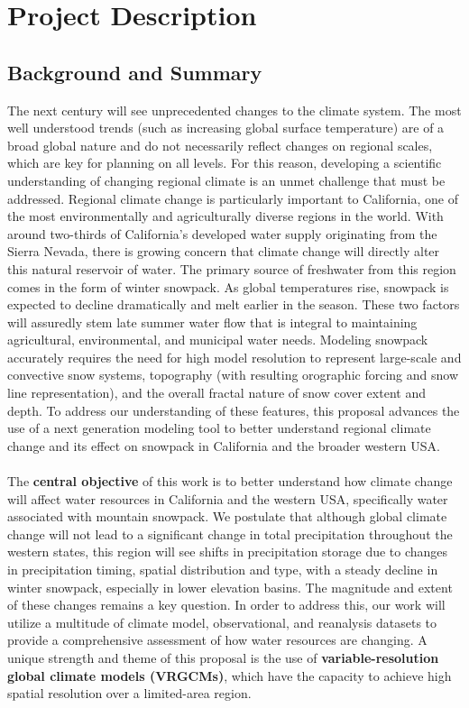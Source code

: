 \documentclass[11pt]{article}
\begin{document}


\section{Project Description}
\subsection{Background and Summary}
The next century will see unprecedented changes to the climate system. The most well understood trends (such as increasing global surface temperature) are of a broad global nature and do not necessarily reflect changes on regional scales, which are key for planning on all levels. For this reason, developing a scientific understanding of changing regional climate is an unmet challenge that must be addressed. Regional climate change is particularly important to California, one of the most environmentally and agriculturally diverse regions in the world. With around two-thirds of California's developed water supply originating from the Sierra Nevada, there is growing concern that climate change will directly alter this natural reservoir of water.  The primary source of freshwater from this region comes in the form of winter snowpack.  As global temperatures rise, snowpack is expected to decline dramatically and melt earlier in the season.  These two factors will assuredly stem late summer water flow that is integral to maintaining agricultural, environmental, and municipal water needs.  Modeling snowpack accurately requires the need for high model resolution to represent large-scale and convective snow systems, topography (with resulting orographic forcing and snow line representation), and the overall fractal nature of snow cover extent and depth. To address our understanding of these features, this proposal advances the use of a next generation modeling tool to better understand regional climate change and its effect on snowpack in California and the broader western USA.
\\\\
The \textbf{central objective} of this work is to better understand how climate change will affect water resources in California and the western USA, specifically water associated with mountain snowpack.  We postulate that although global climate change will not lead to a significant change in total precipitation throughout the western states, this region will see shifts in precipitation storage due to changes in precipitation timing, spatial distribution and type, with a steady decline in winter snowpack, especially in lower elevation basins.  The magnitude and extent of these changes remains a key question.  In order to address this, our work will utilize a multitude of climate model, observational, and reanalysis datasets to provide a comprehensive assessment of how water resources are changing.  A unique strength and theme of this proposal is the use of \textbf{variable-resolution global climate models (VRGCMs)}, which have the capacity to achieve high spatial resolution over a limited-area region.
\end{document}
